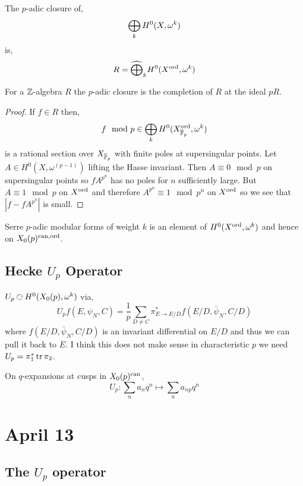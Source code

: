\documentclass[12pt]{article}
\begin{document}
\begin{prop}
The $p$-adic closure of,
\[ \bigoplus_k H^0(X, \omega^k) \]
is,
\[ R = \widehat{\bigoplus}_k H^0(X^{\operatorname{\mathrm{ord}}}, \omega^k) \]
\end{prop}

\begin{rmk}
For a $\mathbb{Z}$-algebra $R$ the $p$-adic closure is the completion of $R$ at the ideal $p R$. 
\end{rmk}

\begin{proof}
If $f \in R$ then,
\[ f \mod p \in \bigoplus_k H^0(X_{\overline{\mathbb{F}}_p}^{\operatorname{\mathrm{ord}}}, \omega^k) \]
is a rational section over $X_{\overline{\mathbb{F}}_p}$ with finite poles at supersingular points. Let $A \in H^0(X, \omega^{(p-1)})$ lifting the Hasse invariant. Then $A \equiv 0 \mod p$ on supersingular points so $f A^{p^n}$ has no poles for $n$ sufficiently large. But $A \equiv 1 \mod p$ on $X^{\operatorname{\mathrm{ord}}}$ and therefore $A^{p^n} \equiv 1 \mod p^n$ on $X^{\operatorname{\mathrm{ord}}}$ so we see that $| f - f A^{p^n}|$ is small. 
\end{proof}

\begin{defn}
Serre $p$-adic modular forms of weight $k$ is an element of $H^0(X^{\operatorname{\mathrm{ord}}}, \omega^k)$ and hence on $X_0(p)^{\mathrm{can}, \operatorname{\mathrm{ord}}}$. 
\end{defn}

\subsection{Hecke $U_p$ Operator}

$U_p \acts H^0(X_0(p), \omega^k)$ via,
\[ U_p f(E, \psi_N, C) = \frac{1}{p} \sum_{D \neq C} \pi^*_{E \to E/D} f(E/D, \bar{\psi}_N, C/D) \]
where $f(E/D, \bar{\psi}_N, C/D)$ is an invariant differential on $E/D$ and thus we can pull it back to $E$. I think this does not make sense in characteristic $p$ we need $U_p = \pi_1^* \operatorname{\mathrm{tr}}{\pi_2}$. 

\begin{prop}
On $q$-expansions at cusps in $X_0(p)^{\mathrm{can}}$,
\[ U_p : \sum_n a_n q^n \mapsto \sum_n a_{np} q^n \]
\end{prop}

\section{April 13}

\subsection{The $U_p$ operator}
\end{document}

